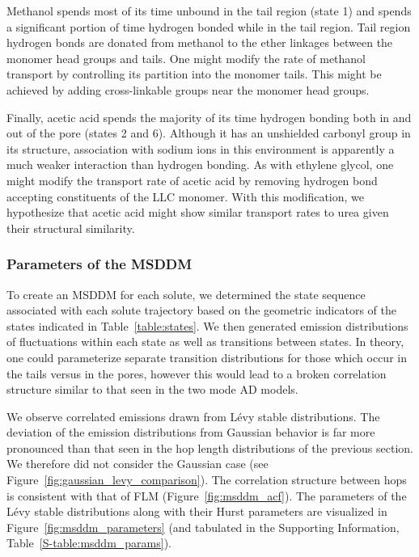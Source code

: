 \documentclass[journal=jctcce,manuscript=article]{achemso}
\begin{document}
  Methanol spends most of its time unbound in the tail region (state 1) and
  spends a significant portion of time hydrogen bonded while in the tail
  region. Tail region hydrogen bonds are donated from methanol to the ether
  linkages between the monomer head groups and tails. One might modify the
  rate of methanol transport by controlling its partition into the monomer
  tails. This might be achieved by adding cross-linkable groups near the
  monomer head groups.
  
  Finally, acetic acid spends the majority of its time hydrogen bonding both in
  and out of the pore (states 2 and 6). Although it has an unshielded carbonyl
  group in its structure, association with sodium ions in this environment is
  apparently a much weaker interaction than hydrogen bonding.  As with ethylene
  glycol, one might modify the transport rate of acetic acid by removing
  hydrogen bond accepting constituents of the LLC monomer. With this
  modification, we hypothesize that acetic acid might show similar transport
  rates to urea given their structural similarity.
  
  \subsubsection{Parameters of the MSDDM}\label{section:msddm_parameterization}

  To create an MSDDM for each solute, we determined the state sequence associated
  with each solute trajectory based on the geometric indicators of the states 
  indicated in Table~\ref{table:states}. We then generated emission distributions of fluctuations
  within each state as well as transitions between states. In theory, one could 
  parameterize separate transition distributions for those which occur in the tails 
  versus in the pores, however this would lead to a broken correlation structure 
  similar to that seen in the two mode AD models.

  We observe correlated emissions drawn from L\'evy stable distributions. The
  deviation of the emission distributions from Gaussian behavior is far more
  pronounced than that seen in the hop length distributions of the previous
  section. We therefore did not consider the Gaussian case (see
  Figure~\ref{fig:gaussian_levy_comparison}). The correlation structure
  between hops is consistent with that of FLM (Figure~\ref{fig:msddm_acf}).
  The parameters of the L\'evy stable distributions along with their Hurst
  parameters are visualized in Figure~\ref{fig:msddm_parameters} (and tabulated
  in the Supporting Information, Table~\ref{S-table:msddm_params}). 
  
\end{document}
